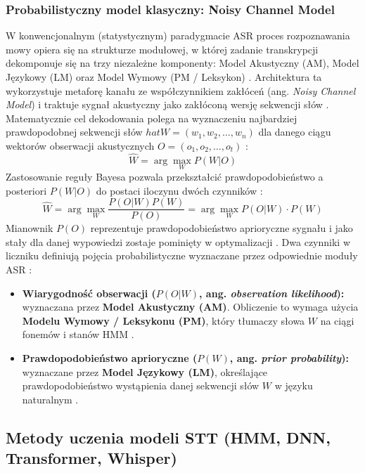 \subsubsection{Probabilistyczny model klasyczny: Noisy Channel Model}
W konwencjonalnym (statystycznym) paradygmacie ASR proces rozpoznawania mowy opiera się na strukturze modułowej, w której zadanie transkrypcji dekomponuje się na trzy niezależne komponenty: Model Akustyczny (AM), Model Językowy (LM) oraz Model Wymowy (PM / Leksykon) \cite[s.~315]{pondel2024e2e}. Architektura ta wykorzystuje metaforę kanału ze współczynnikiem zakłóceń (ang. \textit{Noisy Channel Model}) i traktuje sygnał akustyczny jako zakłóconą wersję sekwencji słów \cite[s.~290]{columbia_asr}. Matematycznie cel dekodowania polega na wyznaczeniu najbardziej prawdopodobnej sekwencji słów $hat{W} = (w_1, w_2, \dots, w_n)$ dla danego ciągu wektorów obserwacji akustycznych $O = (o_1, o_2, \dots, o_t)$ \cite[s.~291]{columbia_asr}:
\begin{equation}
    \hat{W} = \arg\max_{W} P(W|O)
\end{equation}
Zastosowanie reguły Bayesa pozwala przekształcić prawdopodobieństwo a posteriori $P(W|O)$ do postaci iloczynu dwóch czynników \cite[s.~291]{columbia_asr}:
\begin{equation}
    \hat{W} = \arg\max_{W} \frac{P(O|W)P(W)}{P(O)} = \arg\max_{W} {P(O|W)} \cdot {P(W)}
\end{equation}
Mianownik $P(O)$ reprezentuje prawdopodobieństwo aprioryczne sygnału i jako stały dla danej wypowiedzi zostaje pominięty w optymalizacji \cite[s.~291]{columbia_asr}. Dwa czynniki w liczniku definiują pojęcia probabilistyczne wyznaczane przez odpowiednie moduły ASR \cite[s.~291--292]{columbia_asr}:
\begin{itemize}
\item \textbf{Wiarygodność obserwacji ($P(O|W)$, ang. \textit{observation likelihood}):} wyznaczana przez \textbf{Model Akustyczny (AM)}. Obliczenie to wymaga użycia \textbf{Modelu Wymowy / Leksykonu (PM)}, który tłumaczy słowa $W$ na ciągi fonemów i stanów HMM \cite[s.~291--292, 317]{columbia_asr}.
\item \textbf{Prawdopodobieństwo aprioryczne ($P(W)$, ang. \textit{prior probability}):} wyznaczane przez \textbf{Model Językowy (LM)}, określające prawdopodobieństwo wystąpienia danej sekwencji słów $W$ w języku naturalnym \cite[s.~291--292]{columbia_asr}.
\end{itemize}
\subsection{Metody uczenia modeli STT (HMM, DNN, Transformer, Whisper)}

